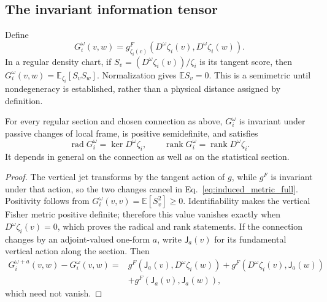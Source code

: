 \subsection{The invariant information tensor}

Define
\begin{equation}
G_i^\omega(v,w)=g^F_{\zeta_i(c)}(D^\omega\zeta_i(v),D^\omega\zeta_i(w)).
\label{eq:induced_metric_full}
\end{equation}
In a regular density chart, if $S_v=(D^\omega\zeta_i(v))/\zeta_i$ is its tangent score, then $G_i^\omega(v,w)=\mathbb E_{\zeta_i}[S_vS_w]$. Normalization gives $\mathbb E S_v=0$. This is a semimetric until nondegeneracy is established, rather than a physical distance assigned by definition.

\begin{proposition}
\label{prop:physical_pullback_scope}
For every regular section and chosen connection as above, $G_i^\omega$ is invariant under passive changes of local frame, is positive semidefinite, and satisfies
\begin{equation}
\operatorname{rad}G_i^\omega=\ker D^\omega\zeta_i,\qquad
\operatorname{rank}G_i^\omega=\operatorname{rank}D^\omega\zeta_i.
\label{eq:physical_pullback_rank}
\end{equation}
It depends in general on the connection as well as on the statistical section.
\end{proposition}
\begin{proof}
The vertical jet transforms by the tangent action of $g$, while $g^F$ is invariant under that action, so the two changes cancel in Eq.~\eqref{eq:induced_metric_full}. Positivity follows from $G_i^\omega(v,v)=\mathbb E[S_v^2]\geq0$. Identifiability makes the vertical Fisher metric positive definite; therefore this value vanishes exactly when $D^\omega\zeta_i(v)=0$, which proves the radical and rank statements. If the connection changes by an adjoint-valued one-form $a$, write $\mathsf J_a(v)$ for its fundamental vertical action along the section. Then
\begin{equation}
\begin{split}
G_i^{\omega+a}(v,w)-G_i^\omega(v,w)
={}&g^F(\mathsf J_a(v),D^\omega\zeta_i(w))
+g^F(D^\omega\zeta_i(v),\mathsf J_a(w))\\
&+g^F(\mathsf J_a(v),\mathsf J_a(w)),
\end{split}
\label{eq:physical_connection_change}
\end{equation}
which need not vanish.
\end{proof}

